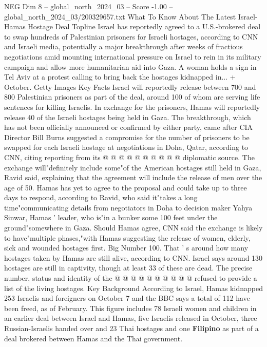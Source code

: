 \begin{textsample}{NEG Dim 8 – global\_north\_2024\_03 – Score -1.00 – global\_north\_2024\_03/200329657.txt}  \label{ex:f8_neg_226}
What To Know About The Latest Israel-Hamas Hostage Deal Topline Israel has reportedly agreed to a U.S.-brokered deal to swap hundreds of Palestinian prisoners for Israeli hostages, according to CNN and Israeli media, potentially a major breakthrough after weeks of fractious negotiations amid mounting international pressure on Israel to rein in its military campaign and allow more humanitarian aid into Gaza.
A woman holds a sign in Tel Aviv at a protest calling to bring back the hostages kidnapped in... + October.
Getty Images Key Facts Israel will reportedly release between 700 and 800 Palestinian prisoners as part of the deal, around 100 of whom are serving life sentences for killing Israelis.
In exchange for the prisoners, Hamas will reportedly release 40 of the Israeli hostages being held in Gaza.
The breakthrough, which has not been officially announced or confirmed by either party, came after CIA Director Bill Burns suggested a compromise for the number of prisoners to be swapped for each Israeli hostage at negotiations in Doha, Qatar, according to CNN, citing reporting from its @ @ @ @ @ @ @ @ @ @ diplomatic source.
The exchange will"definitely include some"of the American hostages still held in Gaza, Ravid said, explaining that the agreement will include the release of men over the age of 50.
Hamas has yet to agree to the proposal and could take up to three days to respond, according to Ravid, who said it"takes a long time"communicating details from negotiators in Doha to decision maker Yahya Sinwar, Hamas ' leader, who is"in a bunker some 100 feet under the ground"somewhere in Gaza.
Should Hamas agree, CNN said the exchange is likely to have"multiple phases,"with Hamas suggesting the release of women, elderly, sick and wounded hostages first.
Big Number 100.
That ' s around how many hostages taken by Hamas are still alive, according to CNN.
Israel says around 130 hostages are still in captivity, though at least 33 of these are dead.
The precise number, status and identity of the @ @ @ @ @ @ @ @ @ @ refused to provide a list of the living hostages.
Key Background According to Israel, Hamas kidnapped 253 Israelis and foreigners on October 7 and the BBC says a total of 112 have been freed, as of February.
This figure includes 78 Israeli women and children in an earlier deal between Israel and Hamas, five Israelis released in October, three Russian-Israelis handed over and 23 Thai hostages and one \textbf{Filipino} as part of a deal brokered between Hamas and the Thai government.

\end{textsample}
